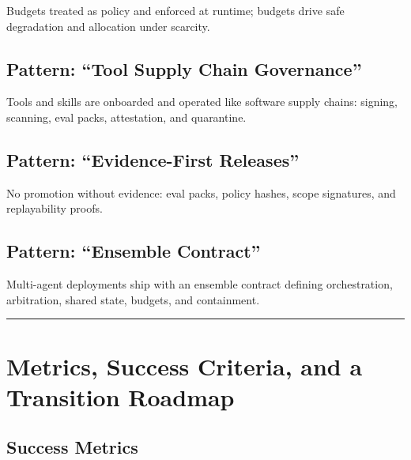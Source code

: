 \documentclass[11pt]{article}
\begin{document}
Budgets treated as policy and enforced at runtime; budgets drive safe
degradation and allocation under scarcity.

\hypertarget{pattern-tool-supply-chain-governance}{%
\subsection{Pattern: ``Tool Supply Chain Governance''}\label{pattern-tool-supply-chain-governance}}

Tools and skills are onboarded and operated like software supply chains:
signing, scanning, eval packs, attestation, and quarantine.

\hypertarget{pattern-evidence-first-releases}{%
\subsection{Pattern: ``Evidence-First Releases''}\label{pattern-evidence-first-releases}}

No promotion without evidence: eval packs, policy hashes, scope
signatures, and replayability proofs.

\hypertarget{pattern-ensemble-contract}{%
\subsection{Pattern: ``Ensemble Contract''}\label{pattern-ensemble-contract}}

Multi-agent deployments ship with an ensemble contract defining
orchestration, arbitration, shared state, budgets, and containment.

\vspace{2pt}\begin{center}\rule{0.62\linewidth}{0.6pt}\end{center}\vspace{2pt}

\hypertarget{metrics-success-criteria-and-a-transition-roadmap}{%
\section{Metrics, Success Criteria, and a Transition Roadmap}\label{metrics-success-criteria-and-a-transition-roadmap}}

\hypertarget{success-metrics}{%
\subsection{Success Metrics}\label{success-metrics}}
\end{document}
